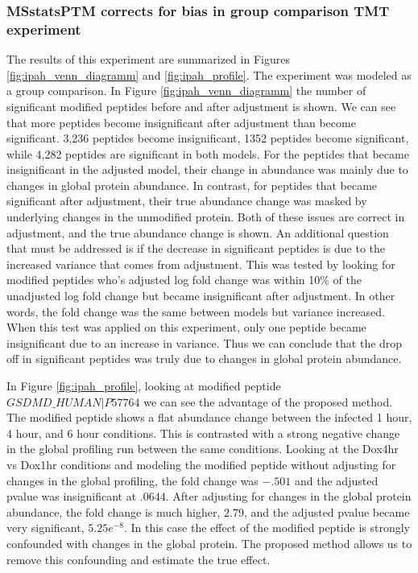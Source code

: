 \documentclass[mcp]{article}
\numberwithin{figure}{section} %
\numberwithin{table}{section}
\begin{document}
\subsubsection*{MSstatsPTM corrects for bias in group comparison TMT experiment}

The results of this experiment are summarized in Figures \ref{fig:ipah_venn_diagramm} and \ref{fig:ipah_profile}. The experiment was modeled as a group comparison. In Figure \ref{fig:ipah_venn_diagramm} the number of significant modified peptides before and after adjustment is shown. We can see that more peptides become insignificant after adjustment than become significant. 3,236 peptides become insignificant, 1352 peptides become significant, while 4,282 peptides are significant in both models. For the peptides that became insignificant in the adjusted model, their change in abundance was mainly due to changes in global protein abundance. In contrast, for peptides that became significant after adjustment, their true abundance change was masked by underlying changes in the unmodified protein. Both of these issues are correct in adjustment, and the true abundance change is shown. An additional question that must be addressed is if the decrease in significant peptides is due to the increased variance that comes from adjustment. This was tested by looking for modified peptides who's adjusted log fold change was within 10\% of the unadjusted log fold change but became insignificant after adjustment. In other words, the fold change was the same between models but variance increased. When this test was applied on this experiment, only one peptide became insignificant due to an increase in variance. Thus we can conclude that the drop off in significant peptides was truly due to changes in global protein abundance.

In Figure \ref{fig:ipah_profile}, looking at modified peptide $GSDMD\_HUMAN|P57764$ we can see the advantage of the proposed method. The modified peptide shows a flat abundance change between the infected 1 hour, 4 hour, and 6 hour conditions. This is contrasted with a strong negative change in the global profiling run between the same conditions. Looking at the Dox4hr vs Dox1hr conditions and modeling the modified peptide without adjusting for changes in the global profiling, the fold change was $-.501$ and the adjusted pvalue was insignificant at $.0644$. After adjusting for changes in the global protein abundance, the fold change is much higher, $2.79$, and the adjusted pvalue became very significant, $5.25e^{-8}$. In this case the effect of the modified peptide is strongly confounded with changes in the global protein. The proposed method allows us to remove this confounding and estimate the true effect. 
\end{document}
